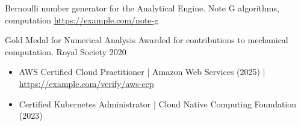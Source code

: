 \documentclass[]{awesome-cv}
\begin{document}
\vspace{-7mm}
\vspace{3pt}
      \begin{cventries}
      \cventry
  {Bernoulli number generator for the Analytical Engine.}
  {Note G}
  {algorithms, computation}
  {\href{https://example.com/note-g}{https://example.com/note-g}}
  {}

\vspace{-5mm}
      \end{cventries}
\vspace{3pt}
    \begin{cvhonors}
    \cvhonor
{Gold Medal for Numerical Analysis}
{Awarded for contributions to mechanical computation.}
{Royal Society}
{2020}
    \end{cvhonors}
\vspace{3pt}
\begin{itemize}
\setlength\itemsep{2pt}
\item AWS Certified Cloud Practitioner | Amazon Web Services (2025) | \href{https://example.com/verify/aws-ccp}{https://example.com/verify/aws-ccp}
\item Certified Kubernetes Administrator | Cloud Native Computing Foundation (2023)
\end{itemize}
    \ 
    
\end{document}
